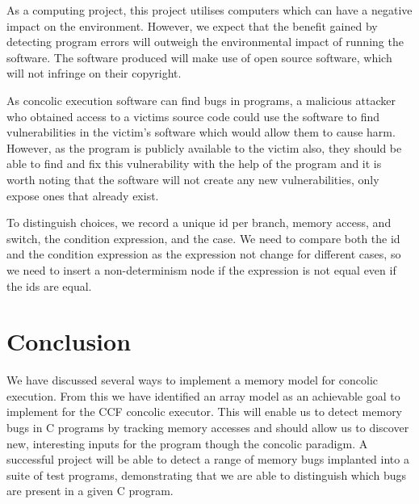 \documentclass[12pt,twoside]{report}
\begin{document}
 As a computing project, this project utilises computers which can have a negative impact on the environment. However, we expect that the benefit gained by detecting program errors will outweigh the environmental impact of running the software. The software produced will make use of open source software, which will not infringe on their copyright.

 As concolic execution software can find bugs in programs, a malicious attacker who obtained access to a victims source code could use the software to find vulnerabilities in the victim's software which would allow them to cause harm. However, as the program is publicly available to the victim also, they should be able to find and fix this vulnerability with the help of the program and it is worth noting that the software will not create any new vulnerabilities, only expose ones that already exist.


To distinguish choices, we record a unique id per branch, memory access, and switch, the condition expression, and the case. We need to compare both the id and the condition expression as the expression not change for different cases, so we need to insert a non-determinism node if the expression is not equal even if the ids are equal.




\chapter{Conclusion}
We have discussed several ways to implement a memory model for concolic execution. From this we have identified an array model as an achievable goal to implement for the CCF concolic executor. This will enable us to detect memory bugs in C programs by tracking memory accesses and should allow us to discover new, interesting inputs for the program though the concolic paradigm. A successful project will be able to detect a range of memory bugs implanted into a suite of test programs, demonstrating that we are able to distinguish which bugs are present in a given C program.




\end{document}

